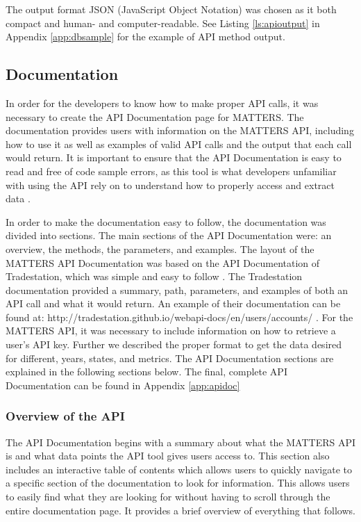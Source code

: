 				The output format JSON (JavaScript Object Notation) was chosen
				as it both compact and human- and computer-readable. See Listing 
				\ref{ls:apioutput} in Appendix \ref{app:dbsample} for the example 
				of API method output. 
				
			\subsection{Documentation}
				
				In order for the developers to know how to make proper API calls, 
				it was necessary to create the API Documentation page for MATTERS. 
				The documentation provides users with information on the MATTERS API, including how to use it as well as examples of valid API calls and the output 
				that each call would return. It is important to ensure that the API Documentation 
				is easy to read and free of code sample errors, as this tool is 
				what developers unfamiliar with using the API rely on to understand how 
				to properly access and extract data \cite{errors}. 
				
				In order to make the documentation easy to follow, the documentation was divided into sections. 
				The main sections of the API Documentation were: an overview, the methods, 
				the parameters, and examples. The layout of the MATTERS API Documentation was based on the 
				API Documentation of Tradestation, which was simple and easy to follow \cite{apiex}. 
				The Tradestation documentation provided a summary, path, parameters, and examples of both an 
				API call and what it would return. An example of their documentation can be found at: 
				http://tradestation.github.io/webapi-docs/en/users/accounts/ \cite{apiex}. For the MATTERS API, 
				it was necessary to include information on how to retrieve a user's API key. 
				Further we described the proper format to get the data desired for different, years, states, 
				and metrics. The API Documentation sections are explained in the following sections below. 
				The final, complete API Documentation can be found in Appendix \ref{app:apidoc}
				
				
			\subsubsection{Overview of the API}
				
				The API Documentation begins with a summary about what the MATTERS API is and what 
				data points the API tool gives users access to. This section also includes an 
				interactive table of contents which allows users to quickly navigate to a specific 
				section of the documentation to look for information. This allows users to easily 
				find what they are looking for without having to scroll through the entire 
				documentation page. It provides a brief overview of everything that follows.
				
